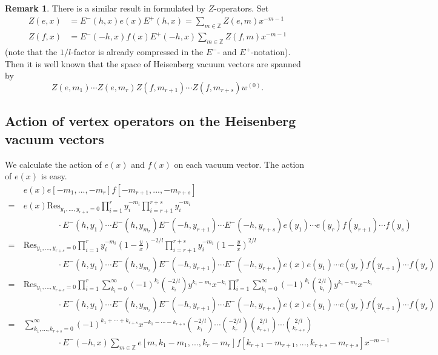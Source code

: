 \documentclass{article}
\theoremstyle{definition}
\newtheorem{rema}[theorem]{Remark}
\newcommand{\Z}{{\mathbb Z}}
\newcommand{\Res}{\text{Res}}
\begin{document}
\begin{rema}
    There is a similar result in \cite{Li-Abel-Coset} formulated by $Z$-operators. 
    Set     
    \begin{align*}
        Z(e,x) &= E^-(h, x) e(x) E^+(h, x) = \sum_{m\in \Z} Z(e, m)x^{-m-1}\\
        Z(f,x) &= E^-(-h, x) f(x) E^+(-h, x) \sum_{m\in \Z} Z(f, m)x^{-m-1}
    \end{align*}
    (note that the $1/l$-factor is already compressed in the $E^-$- and $E^+$-notation). Then it is well known that the space of Heisenberg vacuum vectors are spanned by 
    $$Z(e, m_1) \cdots Z(e, m_r) Z(f, m_{r+1}) \cdots Z(f, m_{r+s})w^{(0)}.$$
\end{rema}

\subsection{Action of vertex operators on the Heisenberg vacuum vectors} We calculate the action of $e(x)$ and $f(x)$ on each vacuum vector. The action of $e(x)$ is easy.
\begin{align*}
    & e(x) e[-m_1, ..., -m_r]f[-m_{r+1}, ..., -m_{r+s}] \\
    = \ & e(x) \Res_{y_1, ...,  y_{r+s} = 0} \prod_{i=1}^r y_i^{-m_i} \prod_{i=r+1}^{r+s} y_i^{-m_i} \\
    & \qquad \qquad \cdot E^-(h, y_1) \cdots E^-(h, y_{m_r}) E^-(-h, y_{r+1}) \cdots E^-(-h, y_{r+s})e(y_1) \cdots e(y_r) f(y_{r+1}) \cdots f(y_s)\\
    = \ & \Res_{y_1, ...,  y_{r+s} = 0} \prod_{i=1}^{r}y_i^{-m_i} \left(1-\frac y x\right)^{-2/l} \prod_{i=r+1}^{r+s}y_i^{-m_i} \left(1-\frac y x\right)^{2/l} \\
    & \qquad \qquad \cdot E^-(h, y_1) \cdots E^-(h, y_{m_r}) E^-(-h, y_{r+1}) \cdots E^-(-h, y_{r+s})e(x)e(y_1) \cdots e(y_r) f(y_{r+1}) \cdots f(y_s)\\
    = \ & \Res_{y_1, ...,  y_{r+s} = 0} \prod_{i=1}^{r}\sum_{k_i=0}^\infty (-1)^{k_i} \binom{-2/l}{k_i} y^{k_i-m_i}x^{-k_i} \prod_{i=1}^{r}\sum_{k_i=0}^\infty (-1)^{k_i} \binom{2/l}{k_i} y^{k_i-m_i}x^{-k_i}  \\
    & \qquad \qquad \cdot E^-(h, y_1) \cdots E^-(h, y_{m_r}) E^-(-h, y_{r+1}) \cdots E^-(-h, y_{r+s})e(x)e(y_1) \cdots e(y_r) f(y_{r+1}) \cdots f(y_s)\\
    = \ & \sum_{k_1, ..., k_{r+s} = 0}^\infty (-1)^{k_1+\cdots + k_{r+s}} x^{-k_1-\cdots -k_{r+s}} \binom{-2/l}{k_1}\cdots \binom{-2/l}{k_r} \binom{2/l}{k_{r+1}}\cdots \binom{2/l}{k_{r+s}} \\
    & \qquad \qquad \cdot E^-(-h, x) \sum_{m\in \Z} e[m, k_1-m_1, ..., k_r-m_r]f[k_{r+1}-m_{r+1}, ..., k_{r+s}-m_{r+s}] x^{-m-1}
\end{align*}
\end{document}
